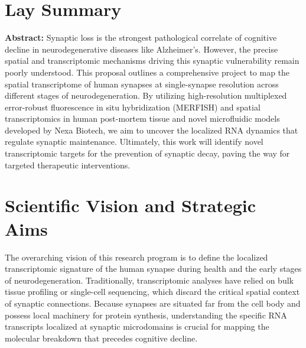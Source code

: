 \documentclass[10pt,a4paper]{article}
\begin{document}
\section*{Lay Summary}
\begin{tcolorbox}[
    colback=primarycolor!5,
    colframe=primarycolor!60,
    arc=4pt,
    leftrule=4pt,
    rightrule=0.5pt,
    toprule=0.5pt,
    bottomrule=0.5pt,
    left=12pt,
    right=12pt,
    top=10pt,
    bottom=10pt
]
    \noindent\textbf{Abstract: } Synaptic loss is the strongest pathological correlate of cognitive decline in neurodegenerative diseases like Alzheimer's. However, the precise spatial and transcriptomic mechanisms driving this synaptic vulnerability remain poorly understood. This proposal outlines a comprehensive project to map the spatial transcriptome of human synapses at single-synapse resolution across different stages of neurodegeneration. By utilizing high-resolution multiplexed error-robust fluorescence in situ hybridization (MERFISH) and spatial transcriptomics in human post-mortem tissue and novel microfluidic models developed by Nexa Biotech, we aim to uncover the localized RNA dynamics that regulate synaptic maintenance. Ultimately, this work will identify novel transcriptomic targets for the prevention of synaptic decay, paving the way for targeted therapeutic interventions.
\end{tcolorbox}

\section{Scientific Vision and Strategic Aims}

The overarching vision of this research program is to define the localized transcriptomic signature of the human synapse during health and the early stages of neurodegeneration. Traditionally, transcriptomic analyses have relied on bulk tissue profiling or single-cell sequencing, which discard the critical spatial context of synaptic connections. Because synapses are situated far from the cell body and possess local machinery for protein synthesis, understanding the specific RNA transcripts localized at synaptic microdomains is crucial for mapping the molecular breakdown that precedes cognitive decline.
\end{document}
